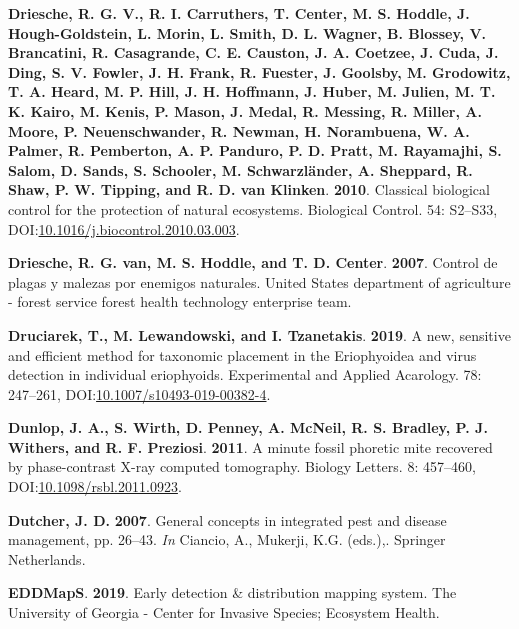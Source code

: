 \documentclass[12pt,final,CPage]{ufthesis}
\newlength{\cslhangindent}
\newenvironment{CSLReferences}[2] %
{%
	\setlength{\parindent}{0pt}
	\ifodd #1 \everypar{\setlength{\hangindent}{\cslhangindent}}\ignorespaces\fi
	\ifnum #2 > 0
	\setlength{\parskip}{#2\baselineskip}
	\fi
}%
{}
\begin{document}
{\begin{CSLReferences}{1}{0}
  \leavevmode{}%
  \textbf{Driesche, R. G. V., R. I. Carruthers, T. Center, M. S. Hoddle, J. Hough-Goldstein, L. Morin, L. Smith, D. L. Wagner, B. Blossey, V. Brancatini, R. Casagrande, C. E. Causton, J. A. Coetzee, J. Cuda, J. Ding, S. V. Fowler, J. H. Frank, R. Fuester, J. Goolsby, M. Grodowitz, T. A. Heard, M. P. Hill, J. H. Hoffmann, J. Huber, M. Julien, M. T. K. Kairo, M. Kenis, P. Mason, J. Medal, R. Messing, R. Miller, A. Moore, P. Neuenschwander, R. Newman, H. Norambuena, W. A. Palmer, R. Pemberton, A. P. Panduro, P. D. Pratt, M. Rayamajhi, S. Salom, D. Sands, S. Schooler, M. Schwarzländer, A. Sheppard, R. Shaw, P. W. Tipping, and R. D. van Klinken}. \textbf{2010}. Classical biological control for the protection of natural ecosystems. Biological Control. 54: S2--S33, DOI:\href{https://doi.org/10.1016/j.biocontrol.2010.03.003}{10.1016/j.biocontrol.2010.03.003}.

  \leavevmode{}%
  \textbf{Driesche, R. G. van, M. S. Hoddle, and T. D. Center}. \textbf{2007}. Control de plagas y malezas por enemigos naturales. {United States} department of agriculture - forest service forest health technology enterprise team.

  \leavevmode{}%
  \textbf{Druciarek, T., M. Lewandowski, and I. Tzanetakis}. \textbf{2019}. A new, sensitive and efficient method for taxonomic placement in the {Eriophyoidea} and virus detection in individual eriophyoids. Experimental and Applied Acarology. 78: 247--261, DOI:\href{https://doi.org/10.1007/s10493-019-00382-4}{10.1007/s10493-019-00382-4}.

  \leavevmode{}%
  \textbf{Dunlop, J. A., S. Wirth, D. Penney, A. McNeil, R. S. Bradley, P. J. Withers, and R. F. Preziosi}. \textbf{2011}. A minute fossil phoretic mite recovered by phase-contrast {X-ray} computed tomography. Biology Letters. 8: 457--460, DOI:\href{https://doi.org/10.1098/rsbl.2011.0923}{10.1098/rsbl.2011.0923}.

  \leavevmode{}%
  \textbf{Dutcher, J. D.} \textbf{2007}. General concepts in integrated pest and disease management, pp. 26--43. \emph{In} Ciancio, A., Mukerji, K.G. (eds.),. Springer Netherlands.

  \leavevmode{}%
  \textbf{EDDMapS}. \textbf{2019}. Early detection \& distribution mapping system. The University of Georgia - Center for Invasive Species; Ecosystem Health.


\end{CSLReferences}}
\end{document}
